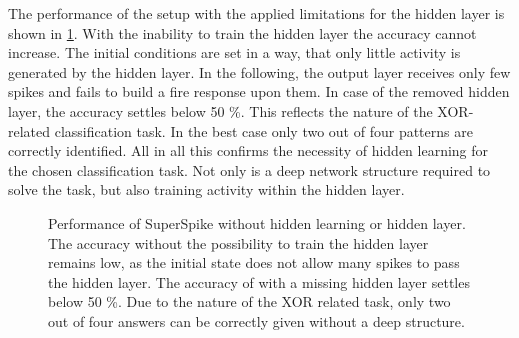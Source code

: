 The performance of the setup with the applied limitations for the hidden layer is shown in \cref{hiddenlearning}. With the inability to train the hidden layer the accuracy cannot increase. The initial conditions are set in a way, that only little activity is generated by the hidden layer. In the following, the output layer receives only few spikes and fails to build a fire response upon them. In case of the removed hidden layer, the accuracy settles below 50 \%. This reflects the nature of the XOR-related classification task. In the best case only two out of four patterns are correctly identified. 
All in all this confirms the necessity of hidden learning for the chosen classification task. Not only is a deep network structure required to solve the task, but also training activity within the hidden layer.

\begin{figure}[htb!]
		\centering
		
	\caption[Performance of SuperSpike without hidden learning or hidden layer.]{Performance of SuperSpike without hidden learning or hidden layer. The accuracy without the possibility to train the hidden layer remains low, as the initial state does not allow many spikes to pass the hidden layer. The accuracy of with a missing hidden layer settles below 50 \%. Due to the nature of the XOR related task, only two out of four answers can be correctly given without a deep structure.}
	\label{hiddenlearning}
\end{figure}

